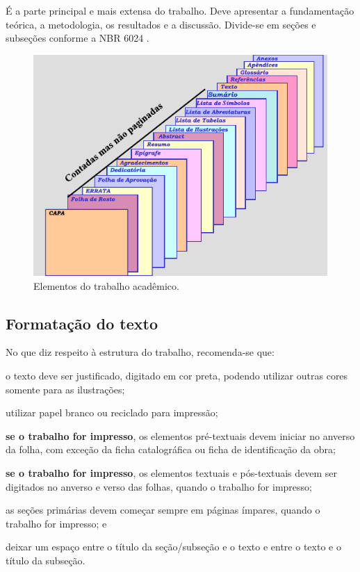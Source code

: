 É a parte principal e mais extensa do trabalho. Deve apresentar a fundamentação teórica, a metodologia, os resultados e a discussão. Divide-se em seções e subseções conforme a NBR 6024 \cite{NBR6024:2012}.

\begin{figure}[htb]
	\caption{\label{fig:Fig_1}Elementos do trabalho acadêmico.}
	\begin{center}
		\includegraphics{images/imagem.pdf}
	\end{center}
\end{figure}

\subsection{Formatação do texto}

No que diz respeito à estrutura do trabalho, recomenda-se que:
\begin{alineas}
	\item o texto deve ser justificado, digitado em cor preta, podendo utilizar outras cores somente para as ilustrações;
	\item utilizar papel branco ou reciclado para impressão;
	\item  \textbf{se o trabalho for impresso}, os elementos pré-textuais devem iniciar no anverso da folha, com exceção da ficha catalográfica ou ficha de identificação da obra;
	\item \textbf{se o trabalho for impresso}, os elementos textuais e pós-textuais devem ser digitados no anverso e verso das folhas, quando o trabalho for impresso;

	\item as seções primárias devem começar sempre em páginas ímpares, quando o trabalho for impresso; e 
	\item deixar um espaço entre o título da seção/subseção e o texto e entre o texto e o título da subseção.
\end{alineas}

